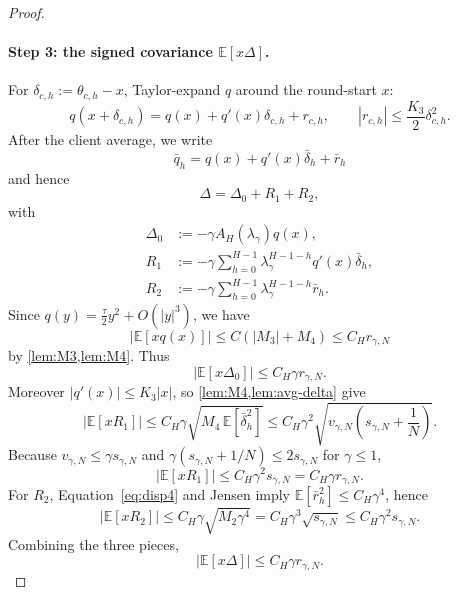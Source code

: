 \documentclass[11pt]{article}
\theoremstyle{definition}
\newcommand{\E}{\mathbb{E}}
\newcommand{\smallscale}{s_{\gamma,N}}
\newcommand{\remscale}{r_{\gamma,N}}
\newcommand{\fourthscale}{v_{\gamma,N}}
\newcommand{\delt}{\delta}
\begin{document}
\begin{proof}
\paragraph{Step 3: the signed covariance $\E[x\Delta]$.}
For $\delt_{c,h}:=\theta_{c,h}-x$, Taylor-expand $q$ around the round-start $x$:
\begin{equation}
\label{eq:q-around-x}
  q(x+\delt_{c,h})
  =q(x)+q'(x)\delt_{c,h}+r_{c,h},
  \qquad
  |r_{c,h}|\le \frac{K_3}{2}\delt_{c,h}^2.
\end{equation}
After the client average, we write
\[
  \bar q_h=q(x)+q'(x)\bar\delt_h+\bar r_h
\]
and hence
\begin{equation}
\label{eq:Delta-split}
  \Delta=\Delta_0+R_1+R_2,
\end{equation}
with
\begin{align*}
  \Delta_0&:=-\gamma A_H(\lambda_\gamma)q(x),\\
  R_1&:=-\gamma\sum_{h=0}^{H-1}\lambda_\gamma^{H-1-h}q'(x)\bar\delt_h,\\
  R_2&:=-\gamma\sum_{h=0}^{H-1}\lambda_\gamma^{H-1-h}\bar r_h.
\end{align*}
Since $q(y)=\frac\tau2y^2+O(|y|^3)$, we have
\[
  |\E[xq(x)]|\le C(|M_3|+M_4)
  \le C_H\remscale
\]
by \cref{lem:M3,lem:M4}. Thus
\begin{equation}
\label{eq:xDelta0}
  |\E[x\Delta_0]|\le C_H\gamma\remscale.
\end{equation}
Moreover $|q'(x)|\le K_3|x|$, so \cref{lem:M4,lem:avg-delta} give
\[
  |\E[xR_1]|
  \le C_H\gamma\sqrt{M_4\,\E[\bar\delt_h^2]}
  \le C_H\gamma^2\sqrt{\fourthscale\left(\smallscale+\frac1N\right)}.
\]
Because $\fourthscale\le\gamma\smallscale$ and
$\gamma(\smallscale+1/N)\le 2\smallscale$ for $\gamma\le1$,
\begin{equation}
\label{eq:xR1}
  |\E[xR_1]|\le C_H\gamma^2\smallscale=C_H\gamma\remscale.
\end{equation}
For $R_2$, Equation~\eqref{eq:disp4} and Jensen imply $\E[\bar r_h^2]\le C_H\gamma^4$, hence
\[
  |\E[xR_2]|
  \le C_H\gamma\sqrt{M_2\gamma^4}
  =C_H\gamma^3\sqrt{\smallscale}
  \le C_H\gamma^2\smallscale.
\]
Combining the three pieces,
\begin{equation}
\label{eq:xDelta-sharp}
  |\E[x\Delta]|\le C_H\gamma\remscale.
\end{equation}


\end{proof}
\end{document}
